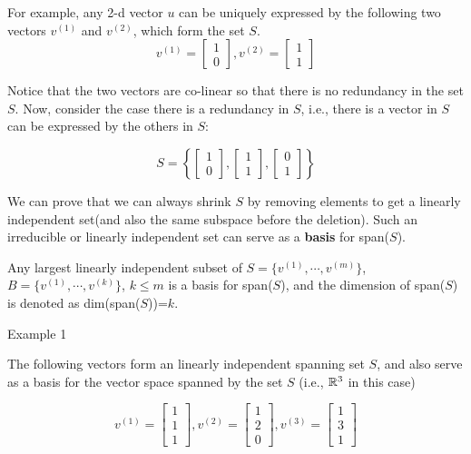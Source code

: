 \vspace{0.5cm}
For example, any 2-d vector $u$ can be uniquely expressed by the following two vectors $v^{(1)}$ and $v^{(2)}$, which form the set $S$. 
$$v^{(1)}= 
\left[ 
\begin{array}{c} 
1 \\
0
\end{array}
\right]
,
v^{(2)}= 
\left[ 
\begin{array}{c} 
1 \\
1
\end{array}
\right]$$


Notice that the two vectors are co-linear so that there is no redundancy in the set $S$. Now, consider the case there is a redundancy in $S$, i.e., there is a vector in $S$ can be expressed by the others in $S$:


$$S=\left\{\left[ 
\begin{array}{c} 
1\\
0
\end{array}
\right],           
\left[ 
\begin{array}{c} 
1\\
1
\end{array}
\right],
\left[ 
\begin{array}{c} 
0\\
1
\end{array}
\right]
\right\}$$

We can prove that we can always shrink $S$ by removing elements to get a linearly independent set(and also the same subspace before the deletion). Such an irreducible or linearly independent set can serve as a \textbf{basis} for span($S$).

Any largest linearly independent subset of $S=\{v^{(1)},\cdots , v^{(m)}\}$, $B=\{v^{(1)},\cdots , v^{(k)}\}$, $k\leq m$ is a basis for span($S$), and the dimension of span($S$) is denoted as  dim(span($S$))=$k$.

\vspace{0.5cm}
Example 1

The following vectors form an linearly independent spanning set $S$, and also serve as a basis for the vector space spanned by the set $S$ (i.e., $\mathbb{R}^{3}$ in this case)

$$v^{(1)}= 
\left[ 
\begin{array}{c} 
1 \\
1 \\
1
\end{array}
\right],
v^{(2)}= 
\left[ 
\begin{array}{c} 
1 \\
2 \\
0
\end{array}
\right],
v^{(3)}= 
\left[ 
\begin{array}{c} 
1 \\
3 \\
1
\end{array}
\right]$$


